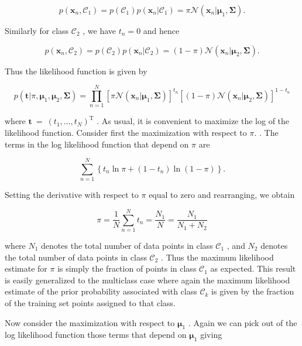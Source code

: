 \documentclass[
  10
]{article}
\begin{document}
\[
p (\mathbf {x} _ {n}, \mathcal {C} _ {1}) = p (\mathcal {C} _ {1}) p (\mathbf {x} _ {n} | \mathcal {C} _ {1}) = \pi \mathcal {N} (\mathbf {x} _ {n} | \boldsymbol {\mu} _ {1}, \boldsymbol {\Sigma}).
\]

Similarly for class \(\mathcal { C } _ { 2 }\) , we have
\(t _ { n } = 0\) and hence

\[
p (\mathbf {x} _ {n}, \mathcal {C} _ {2}) = p (\mathcal {C} _ {2}) p (\mathbf {x} _ {n} | \mathcal {C} _ {2}) = (1 - \pi) \mathcal {N} (\mathbf {x} _ {n} | \boldsymbol {\mu} _ {2}, \boldsymbol {\Sigma}).
\]

Thus the likelihood function is given by

\[
p (\mathbf {t} | \pi , \boldsymbol {\mu} _ {1}, \boldsymbol {\mu} _ {2}, \boldsymbol {\Sigma}) = \prod_ {n = 1} ^ {N} \left[ \pi \mathcal {N} (\mathbf {x} _ {n} | \boldsymbol {\mu} _ {1}, \boldsymbol {\Sigma}) \right] ^ {t _ {n}} \left[ (1 - \pi) \mathcal {N} (\mathbf {x} _ {n} | \boldsymbol {\mu} _ {2}, \boldsymbol {\Sigma}) \right] ^ {1 - t _ {n}}\tag{4.71}
\]

where
\(\mathbf { t } ~ = ~ ( t _ { 1 } , \ldots , t _ { N } ) ^ { \mathrm { T } }\)
. As usual, it is convenient to maximize the log of the likelihood
function. Consider first the maximization with respect to \(\pi .\) .
The terms in the log likelihood function that depend on \(\pi\) are

\[
\sum_ {n = 1} ^ {N} \left\{t _ {n} \ln \pi + (1 - t _ {n}) \ln (1 - \pi) \right\}.\tag{4.72}
\]

Setting the derivative with respect to \(\pi\) equal to zero and
rearranging, we obtain

\[
\pi = \frac {1}{N} \sum_ {n = 1} ^ {N} t _ {n} = \frac {N _ {1}}{N} = \frac {N _ {1}}{N _ {1} + N _ {2}}\tag{4.73}
\]

where \(N _ { 1 }\) denotes the total number of data points in class
\(\mathcal { C } _ { 1 }\) , and \(N _ { 2 }\) denotes the total number
of data points in class \(\mathcal { C } _ { 2 }\) . Thus the maximum
likelihood estimate for \(\pi\) is simply the fraction of points in
class \(\mathcal { C } _ { 1 }\) as expected. This result is easily
generalized to the multiclass case where again the maximum likelihood
estimate of the prior probability associated with class
\(\mathcal { C } _ { k }\) is given by the fraction of the training set
points assigned to that class.

Now consider the maximization with respect to \(\pmb { \mu } _ { 1 }\) .
Again we can pick out of the log likelihood function those terms that
depend on \(\pmb { \mu } _ { 1 }\) giving
\end{document}

